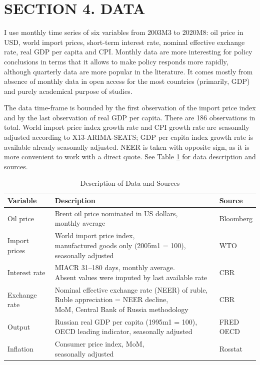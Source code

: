 \documentclass[12pt, a4paper]{extarticle}
\begin{document}
\clearpage
\section*{SECTION 4. DATA}
\setcounter{section}{2}

I use monthly time series of six variables from 2003M3 to 2020M8: oil price in USD, world import prices, short-term interest rate, nominal effective exchange rate, real GDP per capita and CPI. Monthly data are more interesting for policy conclusions in terms that it allows to make policy responds more rapidly, although quarterly data are more popular in the literature. It comes mostly from absence of monthly data in open access for the most countries (primarily, GDP) and purely academical purpose of studies.

The data time-frame is bounded by the first observation of the import price index and by the last observation of real GDP per capita. There are 186 observations in total. World import price index growth rate and CPI growth rate are seasonally adjusted according to X13-ARIMA-SEATS; GDP per capita index growth rate is available already seasonally adjusted. NEER is taken with opposite sign, as it is more convenient to work with a direct quote. See Table \ref{table:variables_decription} for data description and sources.

\begin{table}[b!]
	\centering
	\begin{tabular}{@{}lll@{}}
		\toprule
		Variable  & Description                                              & Source    \\ \midrule
		Oil price & \makecell[l]{Brent oil price nominated in US dollars, \\monthly average} & Bloomberg \\
		Import prices & \makecell[l]{World import price index, \\manufactured goods only (2005m1 = 100), seasonally adjusted}    & WTO        \\
		Interest rate & \makecell[l]{MIACR 31--180 days, monthly average. \\Absent values were imputed by last available rate} & CBR        \\
		Exchange rate & \makecell[l]{Nominal effective exchange rate (NEER) of ruble, \\Ruble appreciation = NEER decline, \\MoM, Central Bank of Russia methodology} & CBR        \\
		Output        & \makecell[l]{Russian real GDP per capita (1995m1 = 100), \\OECD leading indicator, seasonally adjusted}  & \makecell[l]{FRED\\ OECD} \\
		Inflation & \makecell[l]{Consumer price index, MoM, \\seasonally adjusted }          & Rosstat   \\ \bottomrule
	\end{tabular}%
	\caption{Description of Data and Sources}
	\label{table:variables_decription}
\end{table}
\end{document}

